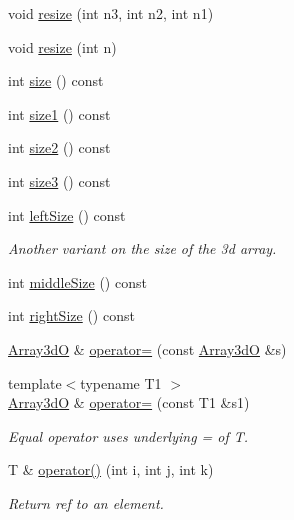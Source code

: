\begin{DoxyCompactItemize}
void \mbox{\hyperlink{classADAT_1_1Array3dO_ac2ad038aba5cf35770c319cb199cd438}{resize}} (int n3, int n2, int n1)
\item 
void \mbox{\hyperlink{classADAT_1_1Array3dO_ade806f07a366f5217783998dda678b6f}{resize}} (int n)
\item 
int \mbox{\hyperlink{classADAT_1_1Array3dO_a44da6abc6d1597d9df0b983691b952fc}{size}} () const
\item 
int \mbox{\hyperlink{classADAT_1_1Array3dO_a30149908b955c7eeebec86a24e6afffd}{size1}} () const
\item 
int \mbox{\hyperlink{classADAT_1_1Array3dO_ab4a1fc3cfddf9238d7ab3fefac03ad18}{size2}} () const
\item 
int \mbox{\hyperlink{classADAT_1_1Array3dO_acd5ccea08cb9cde541a396823af21161}{size3}} () const
\item 
int \mbox{\hyperlink{classADAT_1_1Array3dO_a60f0fb62e8b93e6828fc98df271db054}{left\+Size}} () const
\begin{DoxyCompactList}\small\item\em Another variant on the size of the 3d array. \end{DoxyCompactList}\item 
int \mbox{\hyperlink{classADAT_1_1Array3dO_aff38cae908364701dc0fefd386223c55}{middle\+Size}} () const
\item 
int \mbox{\hyperlink{classADAT_1_1Array3dO_a81a9bfa7afe224267642e822ebe09457}{right\+Size}} () const
\item 
\mbox{\hyperlink{classADAT_1_1Array3dO}{Array3dO}} \& \mbox{\hyperlink{classADAT_1_1Array3dO_a11d4d9d221d7e6598675307926a38f4f}{operator=}} (const \mbox{\hyperlink{classADAT_1_1Array3dO}{Array3dO}} \&s)
\item 
{\footnotesize template$<$typename T1 $>$ }\\\mbox{\hyperlink{classADAT_1_1Array3dO}{Array3dO}} \& \mbox{\hyperlink{classADAT_1_1Array3dO_a7f1b73e1e34cf1e21dfac8af86469ee1}{operator=}} (const T1 \&s1)
\begin{DoxyCompactList}\small\item\em Equal operator uses underlying = of T. \end{DoxyCompactList}\item 
T \& \mbox{\hyperlink{classADAT_1_1Array3dO_a7707d5d50d59bd04eb784754e2128075}{operator()}} (int i, int j, int k)
\begin{DoxyCompactList}\small\item\em Return ref to an element. \end{DoxyCompactList}\item 

\end{DoxyCompactItemize}
